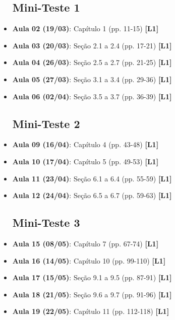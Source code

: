 \documentclass[12pt,a4paper,oneside]{article}
\begin{document}
\begin{itemize}
	
	\subsection{Mini-Teste 1}
	
	\item[] {\bf Aula 02 (19/03)}: Capítulo 1 (pp. 11-15) {\bf \color{blue} [L1]}
	\item[] {\bf Aula 03 (20/03)}: Seção 2.1 a 2.4 (pp. 17-21) {\bf \color{blue} [L1]}
	\item[] {\bf Aula 04 (26/03)}: Seção 2.5 a 2.7 (pp. 21-25) {\bf \color{blue} [L1]}
	\item[] {\bf Aula 05 (27/03)}: Seção 3.1 a 3.4 (pp. 29-36) {\bf \color{blue} [L1]}
	\item[] {\bf Aula 06 (02/04)}: Seção 3.5 a 3.7 (pp. 36-39) {\bf \color{blue} [L1]}
	
	\subsection{Mini-Teste 2}
	
	\item[] {\bf Aula 09 (16/04)}: Capítulo 4 (pp. 43-48) {\bf \color{blue} [L1]}
	\item[] {\bf Aula 10 (17/04)}: Capítulo 5 (pp. 49-53) {\bf \color{blue} [L1]}
	\item[] {\bf Aula 11 (23/04)}: Seção 6.1 a 6.4 (pp. 55-59) {\bf \color{blue} [L1]}
	\item[] {\bf Aula 12 (24/04)}: Seção 6.5 a 6.7 (pp. 59-63) {\bf \color{blue} [L1]}
	
	\subsection{Mini-Teste 3}
	
	\item[] {\bf Aula 15 (08/05)}: Capítulo 7 (pp. 67-74) {\bf \color{blue} [L1]}
	\item[] {\bf Aula 16 (14/05)}: Capítulo 10 (pp. 99-110) {\bf \color{blue} [L1]}
	\item[] {\bf Aula 17 (15/05)}: Seção 9.1 a 9.5 (pp. 87-91) {\bf \color{blue} [L1]}
	\item[] {\bf Aula 18 (21/05)}: Seção 9.6 a 9.7 (pp. 91-96) {\bf \color{blue} [L1]}
	\item[] {\bf Aula 19 (22/05)}: Capítulo 11 (pp. 112-118) {\bf \color{blue} [L1]}
	

\end{itemize}
\end{document}
